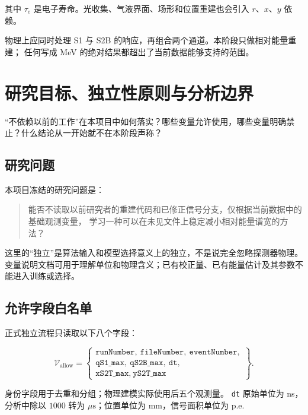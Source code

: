 \documentclass[UTF8,12pt,a4paper,oneside,fontset=none]{ctexart}
\numberwithin{equation}{section}
\begin{document}
其中 \(\tau_e\) 是电子寿命。光收集、气液界面、场形和位置重建也会引入 \(r\)、\(x\)、\(y\) 依赖。

\begin{conclusionbox}
物理上应同时处理 S1 与 S2B 的响应，再组合两个通道。本阶段只做相对能量重建；
任何写成 MeV 的绝对结果都超出了当前数据能够支持的范围。
\end{conclusionbox}

\section{研究目标、独立性原则与分析边界}

\begin{questionbox}
“不依赖以前的工作”在本项目中如何落实？哪些变量允许使用，哪些变量明确禁止？什么结论从一开始就不在本阶段声称？
\end{questionbox}

\subsection{研究问题}

本项目冻结的研究问题是：

\begin{quote}
能否不读取以前研究者的重建代码和已修正信号分支，仅根据当前数据中的基础观测变量，
学习一种可以在未见文件上稳定减小相对能量谱宽的方法？
\end{quote}

这里的“独立”是算法输入和模型选择意义上的独立，不是说完全忽略探测器物理。
变量说明文档可用于理解单位和物理含义；已有校正量、已有能量估计及其参数不能进入训练或选择。

\subsection{允许字段白名单}

正式独立流程只读取以下八个字段：

\begin{equation}
\mathcal V_{\mathrm{allow}}
=
\left\{
\begin{array}{c}
\texttt{runNumber},\ \texttt{fileNumber},\ \texttt{eventNumber},\\
\texttt{qS1\_max},\ \texttt{qS2B\_max},\ \texttt{dt},\\
\texttt{xS2T\_max},\ \texttt{yS2T\_max}
\end{array}
\right\}.
\label{eq:whitelist}
\end{equation}

身份字段用于去重和分组；物理建模实际使用后五个观测量。
\texttt{dt} 原始单位为 ns，分析中除以 \(1000\) 转为 \(\mu\mathrm s\)；位置单位为 mm，信号面积单位为 p.e.
\end{document}
